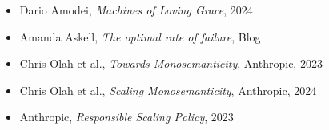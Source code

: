\begin{itemize}
    \item Dario Amodei, \textit{Machines of Loving Grace}, 2024
    \item Amanda Askell, \textit{The optimal rate of failure}, Blog
    \item Chris Olah et al., \textit{Towards Monosemanticity}, Anthropic, 2023
    \item Chris Olah et al., \textit{Scaling Monosemanticity}, Anthropic, 2024
    \item Anthropic, \textit{Responsible Scaling Policy}, 2023
\end{itemize}


